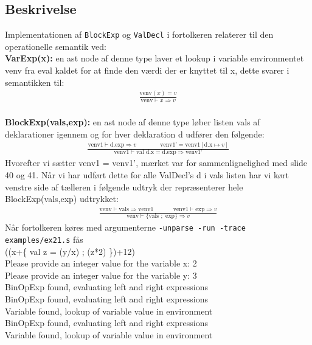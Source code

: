 \documentclass[a4paper, 10pt]{article}
\theoremstyle{remark}
\begin{document}
\subsection*{Beskrivelse}
Implementationen af \texttt{BlockExp} og \texttt{ValDecl} i fortolkeren relaterer til den operationelle semantik ved: \\\textbf{VarExp(x):} en ast node af denne type laver et lookup i variable environmentet venv fra eval kaldet for at finde den værdi der er knyttet til x, dette svarer i semantikken til:
\begin{align*}
	\frac{\text{venv}(x)=v}{\text{venv}\vdash x \Rightarrow v}
\end{align*}
\\\textbf{BlockExp(vals,exp):} en ast node af denne type løber listen vals af deklarationer igennem og for hver deklaration d udfører den følgende:
\begin{align*}
	\frac{\text{venv1}\vdash \text{d.exp} \Rightarrow v \text{ }\text{ }\text{ }\text{ }\text{ }\text{ } \text{venv1'}=\text{venv1} [ \text{d.x}\mapsto v ] }{\text{venv1}\vdash \text{val d.x}=\text{d.exp}\Rightarrow\text{venv1'}}
\end{align*}
Hvorefter vi sætter venv1 = venv1', mærket var for sammenlignelighed med slide 40 og 41. Når vi har udført dette for alle ValDecl's d i vals listen har vi kørt venstre side af tælleren i følgende udtryk der repræsenterer hele BlockExp(vals,exp) udtrykket:
\begin{align*}
	\frac{\text{venv}\vdash \text{vals}\Rightarrow\text{venv1}\text{ }\text{ }\text{ }\text{ }\text{ }\text{venv1}\vdash \text{exp} \Rightarrow v}{\text{venv}\vdash\{\text{vals } ; \text{ exp} \}\Rightarrow v}
\end{align*}
Når fortolkeren køres med argumenterne \texttt{-unparse -run -trace examples/ex21.s} fås
\\((x+\{ val z = (y/x) ; (z*2) \})+12)
\\Please provide an integer value for the variable x: 2
\\Please provide an integer value for the variable y: 3
\\BinOpExp found, evaluating left and right expressions
\\BinOpExp found, evaluating left and right expressions
\\Variable found, lookup of variable value in environment
\\BinOpExp found, evaluating left and right expressions
\\Variable found, lookup of variable value in environment
\end{document}
